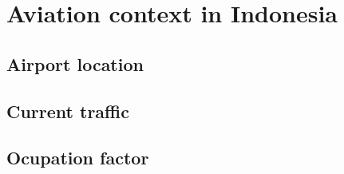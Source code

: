 \section{Aviation context in Indonesia}
	\subsection{Airport location}
	\subsection{Current traffic}
	\subsection{Ocupation factor}
